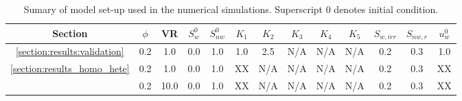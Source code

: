 

\begin{table}
  \begin{tabular}{c | c c  c  c  c  c  c  c  c  c  c   c}
    \hline
      {\bf Section} & $\phi$ & VR  & $S^{0}_{w}$ & $S^{0}_{nw}$ & $K_{1}$ & $K_{2}$ & $K_{3}$ & $K_{4}$ & $K_{5}$ & $S_{w,irr}$ & $S_{nw,r}$ & $u^{0}_{w}$ \\ 
    \hline
      \ref{section:results:validation} & 0.2  & 1.0  & 0.0  & 1.0  & 1.0  & 2.5  & N/A  & N/A  & N/A & 0.2  & 0.3 & 1.0 \\
      \ref{section:results_homo_hete}   & 0.2  & 1.0  & 0.0  & 1.0  &  XX  & N/A  & N/A  & N/A  & N/A & 0.2  & 0.3 & XX  \\
                                       & 0.2  & 10.0 & 0.0  & 1.0  &  XX  & N/A  & N/A  & N/A  & N/A & 0.2  & 0.3 & XX  \\
      \hline
   \end{tabular}
   \caption{Sumary of model set-up used in the numerical simulations. Superscript $0$ denotes initial condition. }\label{table:setup}
\end{table}
